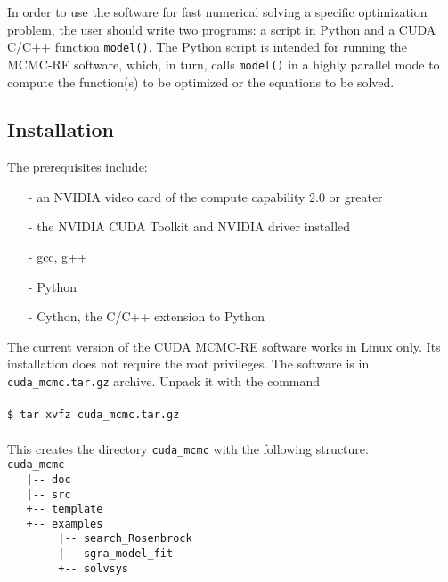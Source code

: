 \documentclass[preprint2]{aastex}
\begin{document}
In order to use the software for fast numerical solving a specific optimization
problem, the user should write two programs: a script in Python and a CUDA C/C++ 
function \verb|model()|. The Python script is intended for running the MCMC-RE 
software, which, in turn, calls \verb|model()| in a highly parallel mode to 
compute the function(s) to be optimized or the equations to be solved. 

\subsection{Installation}

The prerequisites include: 
\begin{enumerate}
  \item[-] an NVIDIA video card of the compute capability 2.0 or greater
  \item[-] the NVIDIA CUDA Toolkit and NVIDIA driver installed
  \item[-] gcc, g++
  \item[-] Python
  \item[-] Cython, the C/C++ extension to Python
\end{enumerate}

The current version of the CUDA MCMC-RE software works in Linux only. Its 
installation does not require the root privileges. The software is in 
\verb|cuda_mcmc.tar.gz| archive. Unpack it with the command \\\\
\verb|$ tar xvfz cuda_mcmc.tar.gz| \\\\
This creates the directory \verb"cuda_mcmc" with the following structure: \\

\verb"cuda_mcmc" \\
\verb"   |-- doc" \\
\verb"   |-- src" \\
\verb"   +-- template" \\
\verb"   +-- examples" \\
\verb"        |-- search_Rosenbrock" \\
\verb"        |-- sgra_model_fit" \\
\verb"        +-- solvsys" \\
\end{document}
